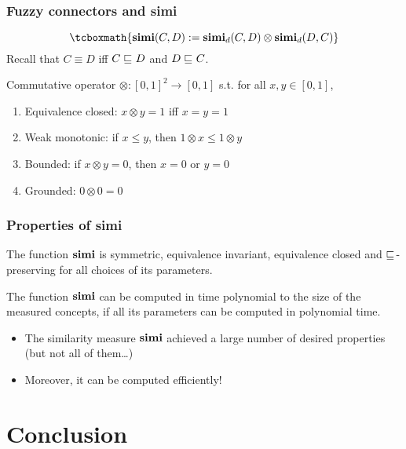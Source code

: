 \documentclass[smaller]{beamer}
\begin{document}
\begin{frame}
  \frametitle{Fuzzy connectors and simi}
  \begin{equation}
    \tcboxmath{\simi(C,D) := \simi_d(C,D) \otimes \simi_d(D,C)}
  \end{equation}
  Recall that \(C \equiv D\) iff \(C \sqsubseteq_{\mathcal{}} D\)
  and \(D \sqsubseteq_{\mathcal{}} C\).
  \begin{definition}
    Commutative operator
    \(\otimes \colon%
    {[0,1]}^2 \to [0,1]\) s.t. for all
    \(x, y \in [0,1]\),
    \begin{enumerate}[<+->]
      \item\label{fu:1} \alert{Equivalence closed}:
      \(x \otimes y = 1\) iff \(x = y = 1\)
      \item\label{fu:2} \alert{Weak monotonic}:
      if \(x \le y\), then
      \(1 \otimes x \le 1 \otimes y\) 
      \item\label{fu:3} \alert{Bounded}:
      if \(x \otimes y = 0\), then
      \(x = 0\) or \(y = 0\)
      \item\label{fu:4} \alert{Grounded}:
      \(0 \otimes 0 = 0\)
    \end{enumerate}
  \end{definition}
\end{frame}

\begin{frame}
  \frametitle{Properties of simi}
  \begin{theorem}
    The function \(\operatorname{\mathbf{simi}}\) is
    symmetric,
    equivalence invariant,
    equivalence closed and
    \(\sqsubseteq_{\mathcal{}}\)-preserving
    for all choices of its parameters.
  \end{theorem}
  \begin{theorem}
    The function \(\operatorname{\mathbf{simi}}\) can be computed in time
    polynomial to the size of the measured concepts,
    if all its parameters can be computed in polynomial time.
  \end{theorem}
  \begin{itemize}
    \item The similarity measure \(\operatorname{\mathbf{simi}}\)
    achieved a large number of desired properties
    (but not all of them\ldots)
    \item Moreover, it can be computed efficiently!
  \end{itemize}
\end{frame}

\section{Conclusion}
\end{document}
